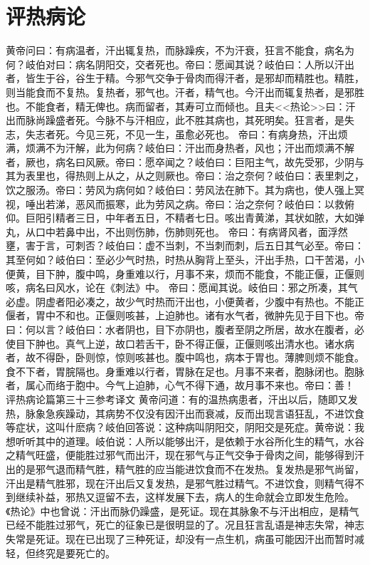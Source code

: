\documentclass[a4paper,12pt,UTF8,twoside]{ctexbook}
\begin{document}
\chapter{评热病论}
黄帝问曰：有病温者，汗出辄复热，而脉躁疾，不为汗衰，狂言不能食，病名为何？岐伯对曰：病名阴阳交，交者死也。帝曰：愿闻其说？岐伯曰：人所以汗出者，皆生于谷，谷生于精。今邪气交争于骨肉而得汗者，是邪却而精胜也。精胜，则当能食而不复热。复热者，邪气也。汗者，精气也。今汗出而辄复热者，是邪胜也。不能食者，精无俾也。病而留者，其寿可立而倾也。且夫<<热论>>曰：汗出而脉尚躁盛者死。今脉不与汗相应，此不胜其病也，其死明矣。狂言者，是失志，失志者死。今见三死，不见一生，虽愈必死也。
帝曰：有病身热，汗出烦满，烦满不为汗解，此为何病？岐伯曰：汗出而身热者，风也；汗出而烦满不解者，厥也，病名曰风厥。帝曰：愿卒闻之？岐伯曰：巨阳主气，故先受邪，少阴与其为表里也，得热则上从之，从之则厥也。帝曰：治之奈何？岐伯曰：表里刺之，饮之服汤。帝曰：劳风为病何如？岐伯曰：劳风法在肺下。其为病也，使人强上冥视，唾出若涕，恶风而振寒，此为劳风之病。帝曰：治之奈何？岐伯曰：以救俯仰。巨阳引精者三日，中年者五日，不精者七日。咳出青黄涕，其状如脓，大如弹丸，从口中若鼻中出，不出则伤肺，伤肺则死也。
帝曰：有病肾风者，面浮然壅，害于言，可刺否？岐伯曰：虚不当刺，不当刺而刺，后五日其气必至。帝曰：其至何如？岐伯曰：至必少气时热，时热从胸背上至头，汗出手热，口干苦渴，小便黄，目下肿，腹中鸣，身重难以行，月事不来，烦而不能食，不能正偃，正偃则咳，病名曰风水，论在《刺法》中。
帝曰：愿闻其说。岐伯曰：邪之所凑，其气必虚。阴虚者阳必凑之，故少气时热而汗出也，小便黄者，少腹中有热也。不能正偃者，胃中不和也。正偃则咳甚，上迫肺也。诸有水气者，微肿先见于目下也。帝曰：何以言？岐伯曰：水者阴也，目下亦阴也，腹者至阴之所居，故水在腹者，必使目下肿也。真气上逆，故口若舌干，卧不得正偃，正偃则咳出清水也。诸水病者，故不得卧，卧则惊，惊则咳甚也。腹中鸣也，病本于胃也。薄脾则烦不能食。食不下者，胃脘隔也。身重难以行者，胃脉在足也。月事不来者，胞脉闭也。胞脉者，属心而络于胞中。今气上迫肺，心气不得下通，故月事不来也。帝曰：善！
评热病论篇第三十三参考译文
黄帝问道：有的温热病患者，汗出以后，随即又发热，脉象急疾躁动，其病势不仅没有因汗出而衰减，反而出现言语狂乱，不进饮食等症状，这叫什麽病？岐伯回答说：这种病叫阴阳交，阴阳交是死症。黄帝说：我想听听其中的道理。岐伯说：人所以能够出汗，是依赖于水谷所化生的精气，水谷之精气旺盛，便能胜过邪气而出汗，现在邪气与正气交争于骨肉之间，能够得到汗出的是邪气退而精气胜，精气胜的应当能进饮食而不在发热。复发热是邪气尚留，汗出是精气胜邪，现在汗出后又复发热，是邪气胜过精气。不进饮食，则精气得不到继续补益，邪热又逗留不去，这样发展下去，病人的生命就会立即发生危险。《热论》中也曾说：汗出而脉仍躁盛，是死证。现在其脉象不与汗出相应，是精气已经不能胜过邪气，死亡的征象已是很明显的了。况且狂言乱语是神志失常，神志失常是死证。现在已出现了三种死证，却没有一点生机，病虽可能因汗出而暂时减轻，但终究是要死亡的。
\end{document}
